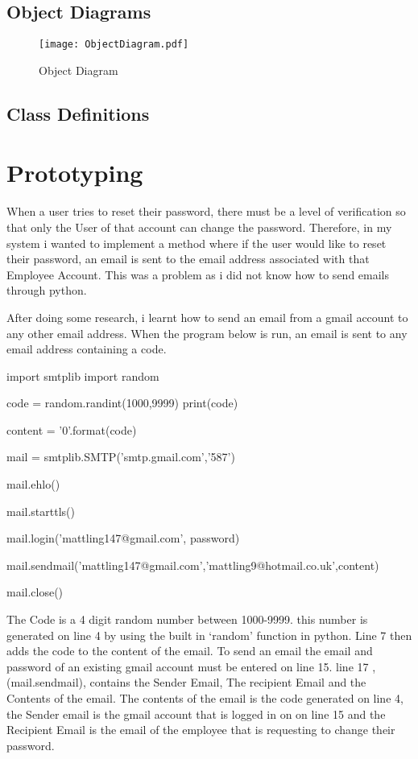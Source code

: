 \subsection{Object Diagrams}

\begin{figure}[H]
\caption{Object Diagram} \label{fig:Object Diagram}
\hfill\texttt{[image: ObjectDiagram.pdf]}\hspace*{\fill}
\end{figure}

\subsection{Class Definitions}

\section{Prototyping}

When a user tries to reset their password, there must be a level of verification so that only the User of that account can change the password. Therefore, in my system i wanted to implement a method where if the user would like to reset their password, an email is sent to the email address associated with that Employee Account. This was a problem as i did not know how to send emails through python. \par

After doing some research, i learnt how to send an email from a gmail account to any other email address. When the program below is run, an email is sent to any email address containing a code.

\begin{python}
import smtplib
import random

code = random.randint(1000,9999)
print(code)

content = '{0}'.format(code)

mail = smtplib.SMTP('smtp.gmail.com','587')

mail.ehlo()

mail.starttls()

mail.login('mattling147@gmail.com', password)

mail.sendmail('mattling147@gmail.com','mattling9@hotmail.co.uk',content)

mail.close()

\end{python}

The Code is a 4 digit random number between 1000-9999. this number is generated on line 4 by using the built in `random' function in python. Line 7 then adds the code to the content of the email. To send an email the email and password of an existing gmail account must be entered on line 15. line 17 , (mail.sendmail), contains the Sender Email, The recipient Email and the Contents of the email. The contents of the email is the code generated on line 4, the Sender email is the gmail account that is logged in on on line 15 and the Recipient Email is the email of the employee that is requesting to change their password.



